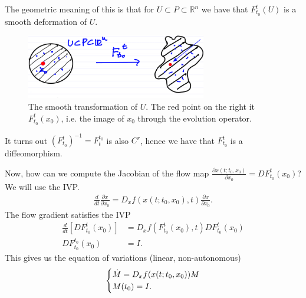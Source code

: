 The geometric meaning of this is that for $U \subset P \subset \mathbb{R}^{n}$ we have that $F_{t_0}^{t}(U)$ is a smooth deformation of $U$.
\begin{figure}[h]
	\centering
	\includegraphics[width=0.7\textwidth]{figures/ch1/7smooth_transform.png}
	\caption{The smooth transformation of $U$. The red point on the right it $F _{t_0}^t(x_0)$, i.e. the image of $x_0$ through the evolution operator.}
\end{figure}
It turns out $\left(F_{t_0}^{t}\right)^{-1} = F_{t}^{t_0}$ is also $C^r$, hence we have that $F_{t_0}^{t}$ is a diffeomorphism. 

Now, how can we compute the Jacobian of the flow map $\frac{\partial x(t; t_0, x_0)}{ \partial x_0} = DF _{t_0}^{t}(x_0)$? We will use the IVP.
\begin{align}
	\frac{d}{dt}\frac{\partial x}{\partial x_0} = D_x f(x(t; t_0, x_0), t) \frac{\partial x}{\partial x_0}.
\end{align}
The flow gradient satisfies the IVP
\begin{align}
	\frac{d}{dt}\left[ DF_{t_0}^{t}(x_0)\right] &= D_{x}f(F_{t_0}^{t}(x_0), t) DF_{t_0}^{t}(x_0) \\
	DF_{t_0}^{t_0}(x_0) &= I.
\end{align}
This gives us the equation of variations (linear, non-autonomous)
\begin{align}
	\begin{dcases}
		\dot{M} = D_x f(x(t; t_0, x_0)) M \\ M(t_0) = I.
	\end{dcases}
\end{align}
